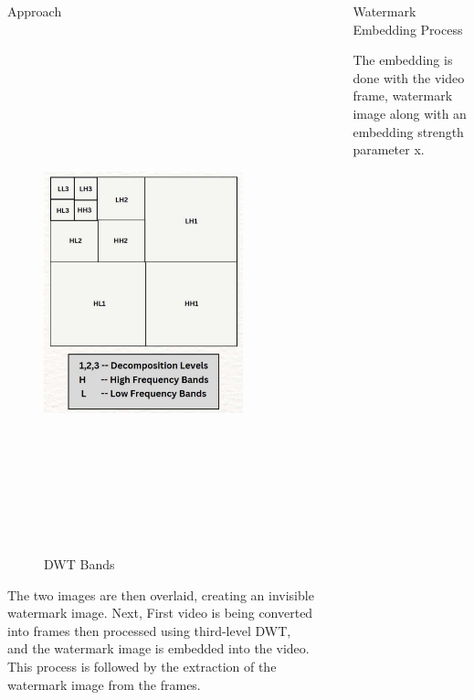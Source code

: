 \documentclass[final]{beamer}
\newlength{\sepwidth}
\newlength{\colwidth}
\newcommand{\separatorcolumn}{\begin{column}{\sepwidth}\end{column}}
\begin{document}
\begin{frame}[t]
\begin{columns}[t]
\begin{column}{\colwidth}
\begin{block}{Approach}
\lipsum
\begin{figure}
    \centering
    \includegraphics[width=0.85\textwidth , height = 15cm]{images and logos/bandsdwt.pdf}
  \caption{DWT Bands}
    \label{fig:img1}

\end{figure}
\lipsum
    The two images are then overlaid, creating an invisible watermark image. Next, First video is being converted into frames then processed using third-level DWT, and the watermark image is embedded into the video. This process is followed by the extraction of the watermark image from the frames.
 \end{block}
 
\end{column}
\separatorcolumn

\begin{column}{\colwidth}

\begin{block}{Watermark Embedding Process}
\par The embedding is done with the 
video frame, watermark image along with an embedding 
strength parameter x.


\end{block}
\end{column}
\end{columns}
\end{frame}
\end{document}
